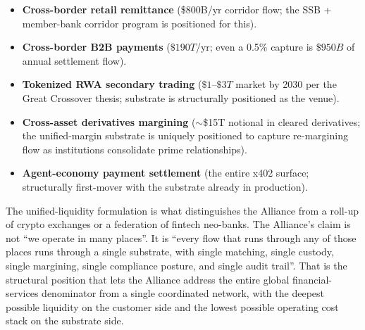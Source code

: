 \begin{itemize}[leftmargin=2em,itemsep=0.1em]
\item \textbf{Cross-border retail remittance} (\$800B/yr corridor
flow; the SSB + member-bank corridor program is positioned for this).
\item \textbf{Cross-border B2B payments} ($\$190T$/yr; even a 0.5\%
capture is $\$950B$ of annual settlement flow).
\item \textbf{Tokenized RWA secondary trading} ($\$1$--$\$3T$ market
by 2030 per the Great Crossover thesis; substrate is structurally
positioned as the venue).
\item \textbf{Cross-asset derivatives margining} ($\sim$\$15T notional
in cleared derivatives; the unified-margin substrate is uniquely
positioned to capture re-margining flow as institutions consolidate
prime relationships).
\item \textbf{Agent-economy payment settlement} (the entire x402
surface; structurally first-mover with the substrate already in
production).
\end{itemize}

The unified-liquidity formulation is what distinguishes the Alliance
from a roll-up of crypto exchanges or a federation of fintech
neo-banks. The Alliance's claim is not ``we operate in many places''.
It is ``every flow that runs through any of those places runs through
a single substrate, with single matching, single custody, single
margining, single compliance posture, and single audit trail''. That
is the structural position that lets the Alliance address the entire
global financial-services denominator from a single coordinated
network, with the deepest possible liquidity on the customer side and
the lowest possible operating cost stack on the substrate side.
